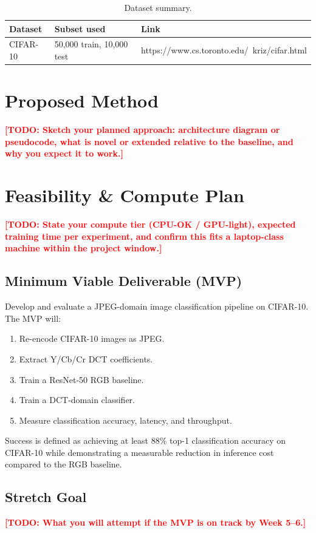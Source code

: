 \documentclass[11pt]{article}
\newcommand{\todo}[1]{\textcolor{red}{\textbf{[TODO: #1]}}}
\begin{document}
\begin{table}[h]
\centering
\caption{Dataset summary.}
\label{tab:data}
\begin{tabular}{@{}lll@{}}
\toprule
\textbf{Dataset} & \textbf{Subset used} & \textbf{Link} \\
\midrule
CIFAR-10 & 50,000 train, 10,000 test & https://www.cs.toronto.edu/~kriz/cifar.html \\
\bottomrule
\end{tabular}
\end{table}

\section{Proposed Method}
\label{sec:method}
\todo{Sketch your planned approach: architecture diagram or pseudocode, what is novel
or extended relative to the baseline, and why you expect it to work.}

\section{Feasibility \& Compute Plan}
\label{sec:feasibility}
\todo{State your compute tier (CPU-OK / GPU-light), expected training time per
experiment, and confirm this fits a laptop-class machine within the project window.}

\subsection{Minimum Viable Deliverable (MVP)}
Develop and evaluate a JPEG-domain image classification pipeline on CIFAR-10. The MVP will:

\begin{enumerate}
    \item Re-encode CIFAR-10 images as JPEG.
    \item Extract Y/Cb/Cr DCT coefficients.
    \item Train a ResNet-50 RGB baseline.
    \item Train a DCT-domain classifier.
    \item Measure classification accuracy, latency, and throughput.
\end{enumerate}

Success is defined as achieving at least 88\% top-1 classification accuracy on CIFAR-10 while demonstrating a measurable reduction in inference cost compared to the RGB baseline.

\subsection{Stretch Goal}
\todo{What you will attempt if the MVP is on track by Week 5--6.}
\end{document}
